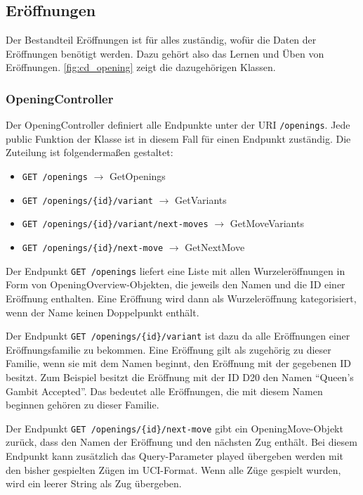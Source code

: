 \subsection{Eröffnungen}
\label{cp:openings}
Der Bestandteil Eröffnungen ist für alles zuständig, wofür die Daten der Eröffnungen benötigt werden. Dazu gehört also das Lernen und Üben von Eröffnungen. \autoref{fig:cd_opening} zeigt die dazugehörigen Klassen.

\subsubsection{OpeningController}
Der OpeningController definiert alle Endpunkte unter der URI \lstinline{/openings}.
Jede public Funktion der Klasse ist in diesem Fall für einen Endpunkt zuständig. Die Zuteilung ist folgendermaßen gestaltet:

\begin{itemize}
  \item \lstinline|GET /openings| $\rightarrow$ GetOpenings
  \item \lstinline|GET /openings/{id}/variant| $\rightarrow$ GetVariants
  \item \lstinline|GET /openings/{id}/variant/next-moves| $\rightarrow$ GetMoveVariants
  \item \lstinline|GET /openings/{id}/next-move| $\rightarrow$ GetNextMove
\end{itemize}

Der Endpunkt \lstinline{GET /openings} liefert eine Liste mit allen Wurzeleröffnungen in Form von OpeningOverview-Objekten, die jeweils den Namen und die ID einer Eröffnung enthalten.
Eine Eröffnung wird dann als Wurzeleröffnung kategorisiert, wenn der Name keinen Doppelpunkt enthält. %

Der Endpunkt \lstinline|GET /openings/{id}/variant| ist dazu da alle Eröffnungen einer Eröffnungsfamilie zu bekommen. Eine Eröffnung gilt als zugehörig zu dieser Familie, wenn sie mit dem Namen beginnt, den Eröffnung mit der gegebenen ID besitzt. Zum Beispiel besitzt die Eröffnung mit der ID D20 den Namen \enquote{Queen's Gambit Accepted}. Das bedeutet alle Eröffnungen, die mit diesem Namen beginnen gehören zu dieser Familie.

Der Endpunkt \lstinline|GET /openings/{id}/next-move| gibt ein OpeningMove-Objekt zurück, dass den Namen der Eröffnung und den nächsten Zug enthält. Bei diesem Endpunkt kann zusätzlich das Query-Parameter played übergeben werden mit den bisher gespielten Zügen im \ac{UCI}-Format. Wenn alle Züge gespielt wurden, wird ein leerer String als Zug übergeben.

